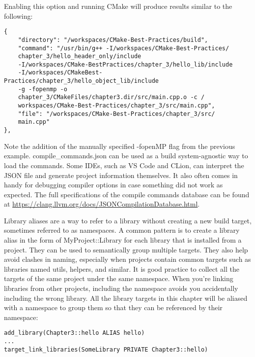 Enabling this option and running CMake will produce results similar to the following:

\begin{lstlisting}[style=styleCMake]
{
	"directory": "/workspaces/CMake-Best-Practices/build",
	"command": "/usr/bin/g++ -I/workspaces/CMake-Best-Practices/
	chapter_3/hello_header_only/include
    -I/workspaces/CMake-BestPractices/chapter_3/hello_lib/include
    -I/workspaces/CMakeBest-Practices/chapter_3/hello_object_lib/include
    -g -fopenmp -o
	chapter_3/CMakeFiles/chapter3.dir/src/main.cpp.o -c /
	workspaces/CMake-Best-Practices/chapter_3/src/main.cpp",
	"file": "/workspaces/CMake-Best-Practices/chapter_3/src/
	main.cpp"
},
\end{lstlisting}

Note the addition of the manually specified -fopenMP flag from the previous example. compile\_commands.json can be used as a build system-agnostic way to load the commands. Some IDEs, such as VS Code and CLion, can interpret the JSON file and generate project information themselves. It also often comes in handy for debugging compiler options in case something did not work as expected. The full specifications of the compile commands database can be found at \url{https://clang.llvm.org/docs/JSONCompilationDatabase.html}.


Library aliases are a way to refer to a library without creating a new build target,
sometimes referred to as namespaces. A common pattern is to create a library alias in
the form of MyProject::Library for each library that is installed from a project.
They can be used to semantically group multiple targets. They also help avoid clashes in
naming, especially when projects contain common targets such as libraries named utils,
helpers, and similar. It is good practice to collect all the targets of the same project
under the same namespace. When you're linking libraries from other projects, including
the namespace avoids you accidentally including the wrong library. All the library targets
in this chapter will be aliased with a namespace to group them so that they can be
referenced by their namespace:

\begin{lstlisting}[style=styleCMake]
add_library(Chapter3::hello ALIAS hello)
...
target_link_libraries(SomeLibrary PRIVATE Chapter3::hello)
\end{lstlisting}


